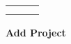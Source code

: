 \begin{table}[H]
\begin{tabular}{|l|l|l|}
                                          &                                                                                                                                                                                                                      &                                                                                                                              \\
                                          &                                                                                                                                                                                                                      &                                                                                                                              \\ \hline
    \end{tabular}
\end{table}



\textbf{ Add Project}

